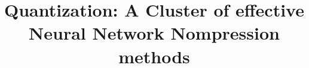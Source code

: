 \documentclass[conference]{IEEEtran}
\begin{document}
\title{Quantization: A Cluster of effective Neural Network Nompression methods}
\author{
}
\maketitle














%
\end{document}
